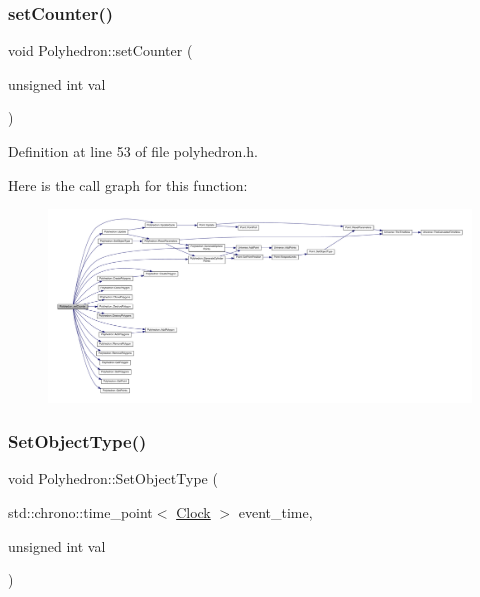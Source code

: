 \subsubsection{\texorpdfstring{set\+Counter()}{setCounter()}}
{\footnotesize\ttfamily void Polyhedron\+::set\+Counter (\begin{DoxyParamCaption}\item[{unsigned int}]{val }\end{DoxyParamCaption})\hspace{0.3cm}{\ttfamily [inline]}}



Definition at line 53 of file polyhedron.\+h.

Here is the call graph for this function\+:
\nopagebreak
\begin{figure}[H]
\begin{center}
\leavevmode
\includegraphics[width=350pt]{class_polyhedron_ad74a1ccc28a08bc2dbc186e5f2c1f694_cgraph}
\end{center}
\end{figure}
\mbox{\label{class_polyhedron_a014c8f981aef5fa1d70dcb5be6a0875a}} 
\subsubsection{\texorpdfstring{Set\+Object\+Type()}{SetObjectType()}}
{\footnotesize\ttfamily void Polyhedron\+::\+Set\+Object\+Type (\begin{DoxyParamCaption}\item[{std\+::chrono\+::time\+\_\+point$<$ \hyperlink{universe_8h_a0ef8d951d1ca5ab3cfaf7ab4c7a6fd80}{Clock} $>$}]{event\+\_\+time,  }\item[{unsigned int}]{val }\end{DoxyParamCaption})}




